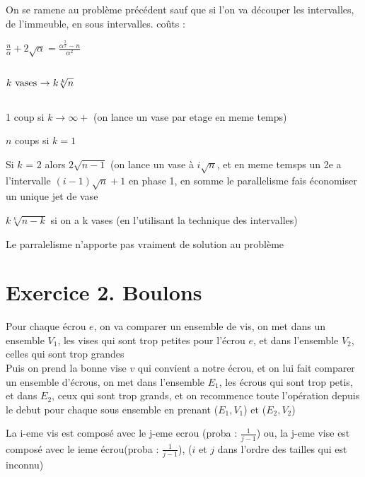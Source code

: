 \documentclass[a4paper]{article}
\begin{document}
On se ramene au problème précédent sauf que si l'on va découper les intervalles, de l'immeuble, en sous intervalles.
coûts : 

\begin{math}
  \frac{n}{\alpha} +2\sqrt{\alpha} = \frac{\alpha^\frac{3}{2}-n}{\alpha^2}
\end{math}

\subsection{}
\begin{math}
k $ vases $ \rightarrow k\sqrt[k]{n}
\end{math}

\subsection{}
\begin{description}
\item 1 coup si $k \rightarrow \infty+$ (on lance un vase par etage en meme temps)
\item $n$ coups si $k = 1$
\item Si $k$ = 2 alors $2\sqrt{n-1}$ (on lance un vase à $i\sqrt{n}$, et en meme temsps un 2e a l'intervalle $(i-1)\sqrt{n}+1$ en phase 1, en somme le parallelisme fais économiser un unique jet de vase
\item $k\sqrt[k]{n-k}$ si on a k vases (en l'utilisant la technique des intervalles)
\end{description}
Le parralelisme n'apporte pas vraiment de solution au problème

\section{Exercice 2. Boulons}
Pour chaque écrou $e$, on va comparer un ensemble de vis, on met dans un ensemble $V_1$, les vises qui sont trop petites pour l'écrou $e$, et dans l'ensemble $V_2$, celles qui sont trop grandes\\
Puis on prend la bonne vise $v$ qui convient a notre écrou, et on lui fait comparer un ensemble d'écrous, on met dans l'ensemble $E_1$, les écrous qui sont trop petis, et dans $E_2$, ceux qui sont trop grands, et on recommence toute l'opération depuis le debut pour chaque sous ensemble en prenant ($E_1, V_1$) et ($E_2, V_2$)

La i-eme vis est composé avec le j-eme ecrou (proba : $\frac{1}{j-1}$) ou, la j-eme vise est composé avec le ieme écrou(proba : $\frac{1}{j-1}$), ($i$ et $j$ dans l'ordre des tailles qui est inconnu)
\end{document}

